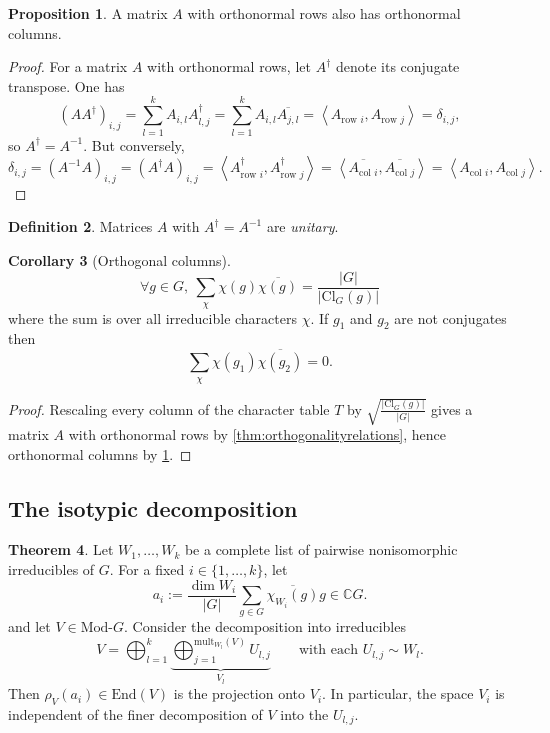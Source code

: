 \documentclass[a4paper]{article}
\newcommand{\mult}{\text{mult}}
\newcommand{\la}{\left\langle}
\newcommand{\ra}{\right\rangle}
\newcommand{\C}{\mathbb{C}}
\newcommand{\Cl}{\text{Cl}}
\newcommand{\End}{\text{End}}
\newcommand{\Mod}{\text{Mod-}}
\theoremstyle{definition}
\newtheorem{defn}{Definition}[subsection]
\newtheorem{prop}[defn]{Proposition}
\newtheorem{thm}[defn]{Theorem}
\newtheorem{coro}[defn]{Corollary}
\begin{document}
\begin{prop}
\label{prop:onRimponC}
A matrix $A$ with orthonormal rows also has orthonormal columns.
\end{prop}
\begin{proof}
For a matrix $A$ with orthonormal rows, let $A^\dagger$ denote its conjugate transpose. One has
\[
(AA^\dagger)_{i,j}=\sum_{l=1}^k A_{i,l}A^\dagger_{l,j}=\sum_{l=1}^k A_{i,l} \overline{A_{j,l}}=\la A_{\text{row }i},A_{\text{row }j}\ra=\delta_{i,j},
\]
so $A^\dagger=A^{-1}$. But conversely,
\[
\delta_{i,j}=(A^{-1}A)_{i,j}=(A^\dagger A)_{i,j}=\la A^\dagger_{\text{row }i},A^\dagger_{\text{row }j} \ra=\la \overline{A_{\text{col }i}},\overline{A_{\text{col }j}} \ra=\la A_{\text{col }i},A_{\text{col }j} \ra.
\]
\end{proof}
\begin{defn}
Matrices $A$ with $A^\dagger=A^{-1}$ are \textit{unitary}.
\end{defn}
\begin{coro}[Orthogonal columns]
\[
\forall g\in G,\ \sum_\chi \chi(g)\overline{\chi(g)}=\frac{|G|}{|\Cl_G(g)|}
\]
where the sum is over all irreducible characters $\chi$. If $g_1$ and $g_2$ are not conjugates then
\[
\sum_\chi \chi(g_1)\overline{\chi(g_2)}=0.
\]
\end{coro}
\begin{proof}
Rescaling every column of the character table $T$ by $\sqrt{\frac{|\Cl_G(g)|}{|G|}}$ gives a matrix $A$ with orthonormal rows by \ref{thm:orthogonalityrelations}, hence orthonormal columns by \ref{prop:onRimponC}.
\end{proof}

\subsection{The isotypic decomposition}
\begin{thm}
\label{thm:isotypicdecomp}
Let $W_1,\ldots,W_k$ be a complete list of pairwise nonisomorphic irreducibles of $G$. For a fixed $i\in\{1,\ldots,k\}$, let
\[
a_i:=\frac{\dim W_i}{|G|}\sum_{g\in G}\overline{\chi_{W_i}(g)}g \in\C G.
\]
and let $V\in\Mod G$. Consider the decomposition into irreducibles
\[
V=\bigoplus_{l=1}^k \underbrace{\bigoplus_{j=1}^{\mult_{W_l}(V)} U_{l,j}}_{V_l}\qquad\text{with each }U_{l,j}\sim W_l.
\]
Then $\rho_V(a_i)\in\End(V)$ is the projection onto $V_i$. In particular, the space $V_i$ is independent of the finer decomposition of $V$ into the $U_{l,j}$.
\end{thm}
\end{document}
